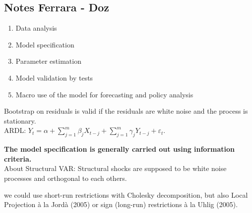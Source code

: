 \subsection{Notes Ferrara - Doz}
\begin{enumerate}
    \item Data analysis
    \item Model specification
    \item Parameter estimation
    \item Model validation by tests
    \item Macro use of the model for forecasting and policy analysis
\end{enumerate}

Bootstrap on residuals is valid if the residuals are white noise and the process is stationary. \\

ARDL: $Y_t = \alpha + \sum_{j=1}^m \beta_j X_{t-j} + \sum_{j=1}^m \gamma_j Y_{t-j} + \varepsilon_t$. 

\textbf{The model specification is generally carried out using
information criteria. }
\\

About Structural VAR: Structural shocks are supposed to be white noise processes and orthogonal to each others.

we could use short-run restrictions with Cholesky decomposition, but also Local Projection à la Jordà (2005) or sign (long-run) restrictions à la Uhlig (2005).

